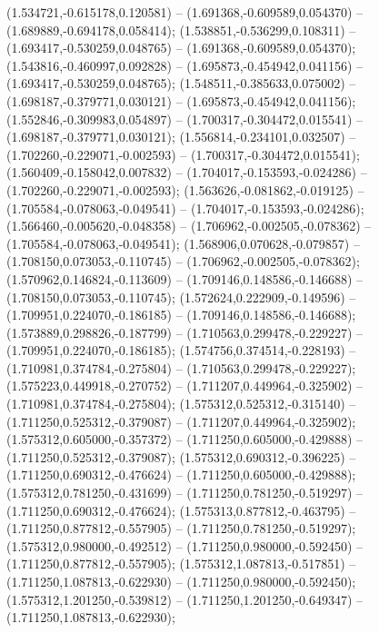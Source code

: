  (1.534721,-0.615178,0.120581) -- (1.691368,-0.609589,0.054370) -- (1.689889,-0.694178,0.058414);
 (1.538851,-0.536299,0.108311) -- (1.693417,-0.530259,0.048765) -- (1.691368,-0.609589,0.054370);
 (1.543816,-0.460997,0.092828) -- (1.695873,-0.454942,0.041156) -- (1.693417,-0.530259,0.048765);
 (1.548511,-0.385633,0.075002) -- (1.698187,-0.379771,0.030121) -- (1.695873,-0.454942,0.041156);
 (1.552846,-0.309983,0.054897) -- (1.700317,-0.304472,0.015541) -- (1.698187,-0.379771,0.030121);
 (1.556814,-0.234101,0.032507) -- (1.702260,-0.229071,-0.002593) -- (1.700317,-0.304472,0.015541);
 (1.560409,-0.158042,0.007832) -- (1.704017,-0.153593,-0.024286) -- (1.702260,-0.229071,-0.002593);
 (1.563626,-0.081862,-0.019125) -- (1.705584,-0.078063,-0.049541) -- (1.704017,-0.153593,-0.024286);
 (1.566460,-0.005620,-0.048358) -- (1.706962,-0.002505,-0.078362) -- (1.705584,-0.078063,-0.049541);
 (1.568906,0.070628,-0.079857) -- (1.708150,0.073053,-0.110745) -- (1.706962,-0.002505,-0.078362);
 (1.570962,0.146824,-0.113609) -- (1.709146,0.148586,-0.146688) -- (1.708150,0.073053,-0.110745);
 (1.572624,0.222909,-0.149596) -- (1.709951,0.224070,-0.186185) -- (1.709146,0.148586,-0.146688);
 (1.573889,0.298826,-0.187799) -- (1.710563,0.299478,-0.229227) -- (1.709951,0.224070,-0.186185);
 (1.574756,0.374514,-0.228193) -- (1.710981,0.374784,-0.275804) -- (1.710563,0.299478,-0.229227);
 (1.575223,0.449918,-0.270752) -- (1.711207,0.449964,-0.325902) -- (1.710981,0.374784,-0.275804);
 (1.575312,0.525312,-0.315140) -- (1.711250,0.525312,-0.379087) -- (1.711207,0.449964,-0.325902);
 (1.575312,0.605000,-0.357372) -- (1.711250,0.605000,-0.429888) -- (1.711250,0.525312,-0.379087);
 (1.575312,0.690312,-0.396225) -- (1.711250,0.690312,-0.476624) -- (1.711250,0.605000,-0.429888);
 (1.575312,0.781250,-0.431699) -- (1.711250,0.781250,-0.519297) -- (1.711250,0.690312,-0.476624);
 (1.575313,0.877812,-0.463795) -- (1.711250,0.877812,-0.557905) -- (1.711250,0.781250,-0.519297);
 (1.575312,0.980000,-0.492512) -- (1.711250,0.980000,-0.592450) -- (1.711250,0.877812,-0.557905);
 (1.575312,1.087813,-0.517851) -- (1.711250,1.087813,-0.622930) -- (1.711250,0.980000,-0.592450);
 (1.575312,1.201250,-0.539812) -- (1.711250,1.201250,-0.649347) -- (1.711250,1.087813,-0.622930);
